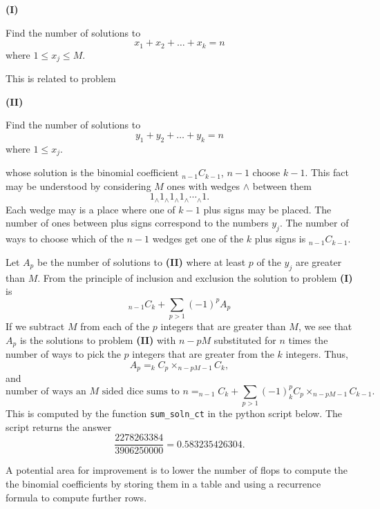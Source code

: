 \documentclass{article}
\newcommand{\mintedpython}[1]{\inputminted[frame=lines,framesep=2mm,baselinestretch=1.2,bgcolor=LightGray,fontsize=\footnotesize,linenos]{python}{#1}}
\begin{document}
\hspace*{\fill} {\bf (I)} \hspace*{0.5in} \begin{minipage}{0.5\textwidth}
 Find the number of solutions to
\[x_1+x_2+\dots+x_k=n\]
where $1 \leq x_j\leq M$.
\end{minipage}
\hspace*{\fill}

This is related to problem 

\hspace*{\fill} {\bf (II)} \hspace*{0.5in} \begin{minipage}{0.5\textwidth}
 Find the number of solutions to
\[y_1+y_2+\dots+y_k=n\]
where $1 \leq x_j $.
\end{minipage}
\hspace*{\fill}

whose solution is the binomial coefficient $_{n-1}C_{k-1}$, $n-1$ choose $k-1$.  This fact may be understood by considering $M$ ones with wedges $\wedge$ between them
\[1 {_\wedge} 1 {_\wedge} 1 {_\wedge} 1 {_\wedge} \cdots {_\wedge} 1.\]
Each wedge may is a place where one of $k-1$ plus signs may be placed.  The number of ones between plus signs correspond to the numbers $y_j$.  The number of ways to choose which of the $n-1$ wedges get one of the $k$ plus signs is $_{n-1}C_{k-1}$.  

\bigskip
Let $A_p$ be the number of solutions to {\bf (II)} where at least $p$ of the $y_j$ are greater than $M$.  From the principle of inclusion and exclusion the solution to problem {\bf (I)} is
\[_{n-1}C_k +\sum_{p>1} (-1)^p A_p \]
If we subtract $M$ from each of the $p$ integers that are greater than $M$, we see that $A_p$ is the solutions to problem {\bf (II)} with $n-pM$ substituted for $n$ times the number of ways to pick the $p$ integers that are greater from the $k$ integers.  Thus,
\[A_p=_k C _p \times _{n-pM-1} C _{k},\]
and
\[
\text{number of ways an }M\text{ sided dice sums to }n=_{n-1}C_k +\sum_{p>1} (-1)^p _k C _p \times _{n-pM-1} C _{k-1}.
\]
This is computed by the function \texttt{sum{\_}soln{\_}ct} in the python script below.  The script returns the answer
\[\frac{2278263384}{3906250000}=0.583235426304.\]

\bigskip
A potential area for improvement is to lower the number of flops to compute the the binomial coefficients by storing them in a table and using a recurrence formula to compute further rows. 

\mintedpython{Python_coding_challenge/problem2.py}
\end{document}
